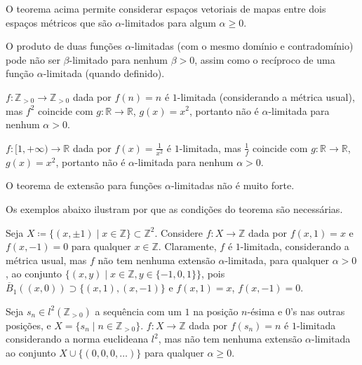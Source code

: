 O teorema acima permite considerar espaços vetoriais de mapas entre dois espaços métricos que são $\alpha$-limitados para algum $\alpha \ge 0$.

O produto de duas funções $\alpha$-limitadas (com o mesmo domínio e contradomínio) pode não ser $\beta$-limitado para nenhum $\beta > 0$, assim como o recíproco de uma função $\alpha$-limitada (quando definido).

\begin{example}
  $f : \mathbb{Z}_{> 0} \to \mathbb{Z}_{> 0}$ dada por $f(n) = n$ é $1$-limitada (considerando a métrica usual), mas $f^2$ coincide com $g : \mathbb{R} \to \mathbb{R}$, $g(x) = x^2$, portanto não é $\alpha$-limitada para nenhum $\alpha > 0$.
\end{example}

\begin{example}
  $f : [1, +\infty) \to \mathbb{R}$ dada por $f(x) = \frac{1}{x^2}$ é $1$-limitada, mas $\frac{1}{f}$ coincide com $g : \mathbb{R} \to \mathbb{R}$, $g(x) = x^2$, portanto não é $\alpha$-limitada para nenhum $\alpha > 0$.
\end{example}

O teorema de extensão para funções $\alpha$-limitadas não é muito forte.

Os exemplos abaixo ilustram por que as condições do teorema são necessárias.

\begin{example}
  Seja $X \coloneqq \{(x, \pm 1) \mid x \in \mathbb{Z}\} \subset \mathbb{Z}^2$. Considere $f : X \to \mathbb{Z}$ dada por $f(x, 1) = x$ e $f(x, -1) = 0$ para qualquer $x \in \mathbb{Z}$. Claramente, $f$ é $1$-limitada, considerando a métrica usual, mas $f$ não tem nenhuma extensão $\alpha$-limitada, para qualquer $\alpha > 0$, ao conjunto $\{(x, y) \mid x \in \mathbb{Z}, y \in \{-1,0,1\}\}$, pois $\overline{B}_1((x, 0)) \supset \{ (x, 1), (x, -1) \}$ e $f(x, 1) = x$, $f(x, -1) = 0$.
\end{example}



\begin{example}
  Seja $s_n \in l^2(\mathbb{Z}_{> 0})$ a sequência com um $1$ na posição $n$-ésima e $0$'s nas outras posições, e $X = \{ s_n \mid n \in \mathbb{Z}_{> 0} \}$. $f : X \to \mathbb{Z}$ dada por $f(s_n) = n$ é $1$-limitada considerando a norma euclideana $l^2$, mas não tem nenhuma extensão $\alpha$-limitada ao conjunto $X \cup \{(0, 0, 0, \dots)\}$ para qualquer $\alpha \ge 0$.
\end{example}

